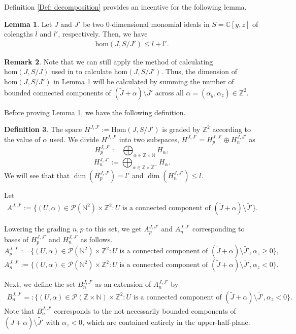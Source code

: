 \documentclass[11pt,a4paper,leqno,noamsfonts]{amsart}
\numberwithin{equation}{section}
\newcommand{\BC}{{\mathbb{C}}}
\newcommand{\BZ}{{\mathbb{Z}}}
\theoremstyle{definition}
\newtheorem{definition}{Definition}[section]
\newtheorem{remark}[definition]{Remark}
\theoremstyle{thm}
\newtheorem{lemma}[definition]{Lemma}
\theoremstyle{ex}
\theoremstyle{sol}
\begin{document}
Definition \ref{Def: decomposition} provides an incentive for the following lemma. 


\begin{lemma}\label{Lem:inequalityL1L2}
    Let $J$ and $J'$ be two $0$-dimensional monomial ideals in $S=\BC[y,z]$ of colengths $l$ and $l'$, respectively. Then, we have
    \begin{align}\label{eq: Ineq}
       \mathrm{hom}(J,S/J')\leq l+l'.
    \end{align}
\end{lemma}


\begin{remark}Note that we can still apply the method of calculating $\mathrm{hom}(J,S/J)$ used in \cite{Ramkumar-Sammartano} to calculate $\mathrm{hom}(J,S/J')$. Thus, the dimension of $\mathrm{hom}(J,S/J')$ in Lemma \ref{Lem:inequalityL1L2} will be calculated by summing the number of bounded connected components of $(\tilde{J}+\alpha)\setminus \tilde{J'}$ across all $\alpha=(\alpha_y,\alpha_z)\in\BZ^2$.
\end{remark}
Before proving Lemma \ref{Lem:inequalityL1L2}, we have the following definition.


\begin{definition}\label{Def:AJ}
The space $H^{J,J'}:=\mathrm{Hom}(J,S/J')$ is graded by $\mathbb{Z}^2$ according to the value of $\alpha$ used. We divide $H^{J,J'}$ into two subspaces, $H^{J,J'}=H^{J,J'}_p\oplus H^{J,J'}_n$ as
\[H^{J,J'}_p:=\bigoplus_{\alpha\in\mathbb{Z}\times\mathbb{N}}H_\alpha,\]
\[H^{J,J'}_n:=\bigoplus_{\alpha\in\mathbb{Z}\times\mathbb{Z}^-}H_\alpha.\]
We will see that that $\dim(H^{J,J'}_p)=l'$ and $\dim(H^{J,J'}_n)\leq l$. 

Let
\begin{align*}   
A^{J,J'}:=\{(U,\alpha)\in\mathcal{P}(\mathbb{N}^2)\times\mathbb{Z}^2:U\text{ is a connected component of }(\tilde{J}+\alpha)\setminus \tilde{J'}\}.\end{align*}

Lowering the grading $n,p$ to this set,  we get $A^{J,J'}_p$ and $A^{J,J'}_n$ corresponding to bases of $H^{J,J'}_p$ and $H^{J,J'}_n$ as follows. 
\[A^{J,J'}_p:=\{(U,\alpha)\in\mathcal{P}(\mathbb{N}^2)\times\mathbb{Z}^2:U\text{ is a connected component of }(\tilde{J}+\alpha)\setminus \tilde{J'},\alpha_z\geq 0\},\]
\[A^{J,J'}_n:=\{(U,\alpha)\in\mathcal{P}(\mathbb{N}^2)\times\mathbb{Z}^2:U\text{ is a connected component of }(\tilde{J}+\alpha)\setminus \tilde{J'},\alpha_z<0\}.\]

Next, we define the set $B^{J,J'}_n$ as an extension of $A^{J,J'}_n$ by
\begin{align*}    
B^{J,J'}_n=:\{(U,\alpha)\in\mathcal{P}(\mathbb{Z}\times\mathbb{N})\times\mathbb{Z}^2:U\text{ is a connected component of } ( \tilde{J}+\alpha)\setminus\tilde{J'},\alpha_z<0\}.\end{align*}
Note that $B^{J,J'}_n$ corresponds to the not necessarily bounded components of $(\tilde{J}+\alpha)\setminus\tilde{J'}$ with $\alpha_z<0$, which are contained entirely in the upper-half-plane.


    
\end{definition}
\end{document}
